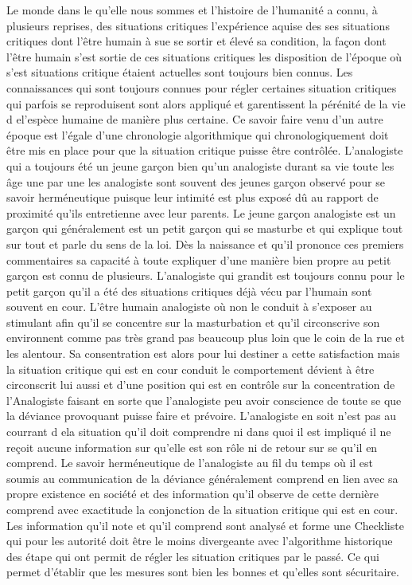 \documentclass[12pt,a4paper]{article}
\begin{document}
Le monde dans le qu'elle nous sommes et l'histoire de l’humanité a connu, à plusieurs reprises, des situations critiques l'expérience aquise des ses situations critiques dont l'être humain à sue se sortir et élevé sa condition, la façon dont l'être humain s'est sortie de ces situations critiques les disposition de l'époque où s'est situations critique étaient actuelles sont toujours bien connus. Les connaissances qui sont toujours connues pour régler certaines situation critiques qui parfois se reproduisent sont alors appliqué et garentissent la pérénité de la vie d el'espèce humaine de manière plus certaine. Ce savoir faire venu d'un autre époque est l'égale d'une chronologie algorithmique qui chronologiquement doit être mis en place pour que la situation critique puisse être contrôlée. L'analogiste qui a toujours été un jeune garçon bien qu'un analogiste durant sa vie toute les âge une par une les analogiste sont souvent des jeunes garçon observé pour se savoir herméneutique puisque leur intimité est plus exposé dû au rapport de proximité qu'ils entretienne avec leur parents. Le jeune garçon analogiste est un garçon qui généralement est un petit garçon qui se masturbe et qui explique tout sur tout et parle du sens de la loi. Dès la naissance et qu'il prononce ces premiers commentaires sa capacité à toute expliquer d'une manière bien propre au petit garçon est connu de plusieurs. L'analogiste qui grandit est toujours connu pour le petit garçon qu'il a été des situations critiques déjà vécu par l'humain sont souvent en cour. L'être humain analogiste où non le conduit à s'exposer au stimulant afin qu'il se concentre sur la masturbation et qu'il circonscrive son environnent comme pas très grand pas beaucoup plus loin que le coin de la rue et les alentour. Sa consentration est alors pour lui destiner a cette satisfaction mais la situation critique qui est en cour conduit le comportement dévient à être circonscrit lui aussi et d'une position qui est en contrôle sur la concentration de l'Analogiste faisant en sorte que l'analogiste peu avoir conscience de toute se que la déviance provoquant puisse faire et prévoire. L'analogiste en soit n'est pas au courrant d ela situation qu'il doit comprendre ni dans quoi il est impliqué il ne reçoit aucune information sur qu'elle est son rôle ni de retour sur se qu'il en comprend. Le savoir herméneutique de l'analogiste au fil du temps où il est soumis au communication de la déviance généralement comprend en lien avec sa propre existence 
en société et des information qu'il observe de cette dernière comprend avec exactitude la conjonction de la situation critique qui est en cour. Les information qu'il note et qu'il comprend sont analysé et forme une Checkliste qui pour les autorité doit être le moins divergeante avec l'algorithme historique des étape qui ont permit de régler les situation critiques par le passé. Ce qui permet d'établir que les mesures sont bien les bonnes et qu'elles sont sécuritaire.
\end{document}
